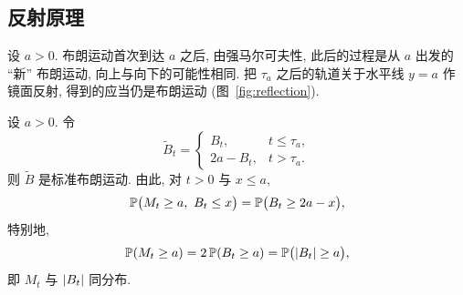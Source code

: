 \subsection{反射原理}

设 $a>0$. 布朗运动首次到达 $a$ 之后, 由强马尔可夫性, 此后的过程是从 $a$ 出发的 ``新'' 布朗运动, 向上与向下的可能性相同. 把 $\tau_a$ 之后的轨道关于水平线 $y=a$ 作镜面反射, 得到的应当仍是布朗运动 (图~\ref{fig:reflection}).

\begin{theorem}[反射原理]\label{thm:reflection}
设 $a>0$. 令
\[
\widetilde{B}_t=\begin{cases}B_t,&t\le\tau_a,\\ 2a-B_t,&t>\tau_a.\end{cases}
\]
则 $\widetilde{B}$ 是标准布朗运动. 由此, 对 $t>0$ 与 $x\le a$,
\begin{equation}\label{eq:reflection-joint}
\P\big(M_t\ge a,\ B_t\le x\big)=\P\big(B_t\ge2a-x\big),
\end{equation}
特别地,
\begin{equation}\label{eq:reflection-max}
\P(M_t\ge a)=2\,\P(B_t\ge a)=\P\big(\abs{B_t}\ge a\big),
\end{equation}
即 $M_t$ 与 $\abs{B_t}$ 同分布.
\end{theorem}

